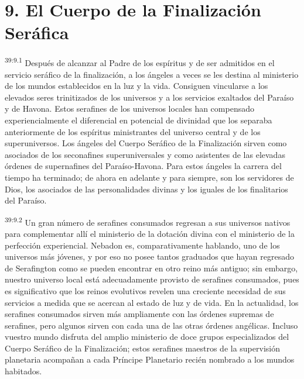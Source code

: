 \section*{9. El Cuerpo de la Finalización Seráfica}
\par
\textsuperscript{39:9.1} Después de alcanzar al Padre de los espíritus y de ser admitidos en el servicio seráfico de la finalización, a los ángeles a veces se les destina al ministerio de los mundos establecidos en la luz y la vida. Consiguen vincularse a los elevados seres trinitizados de los universos y a los servicios exaltados del Paraíso y de Havona. Estos serafines de los universos locales han compensado experiencialmente el diferencial en potencial de divinidad que los separaba anteriormente de los espíritus ministrantes del universo central y de los superuniversos. Los ángeles del Cuerpo Seráfico de la Finalización sirven como asociados de los seconafines superuniversales y como asistentes de las elevadas órdenes de supernafines del Paraíso-Havona. Para estos ángeles la carrera del tiempo ha terminado; de ahora en adelante y para siempre, son los servidores de Dios, los asociados de las personalidades divinas y los iguales de los finalitarios del Paraíso.

\par
\textsuperscript{39:9.2} Un gran número de serafines consumados regresan a sus universos nativos para complementar allí el ministerio de la dotación divina con el ministerio de la perfección experiencial. Nebadon es, comparativamente hablando, uno de los universos más jóvenes, y por eso no posee tantos graduados que hayan regresado de Serafington como se pueden encontrar en otro reino más antiguo; sin embargo, nuestro universo local está adecuadamente provisto de serafines consumados, pues es significativo que los reinos evolutivos revelen una creciente necesidad de sus servicios a medida que se acercan al estado de luz y de vida. En la actualidad, los serafines consumados sirven más ampliamente con las órdenes supremas de serafines, pero algunos sirven con cada una de las otras órdenes angélicas. Incluso vuestro mundo disfruta del amplio ministerio de doce grupos especializados del Cuerpo Seráfico de la Finalización; estos serafines maestros de la supervisión planetaria acompañan a cada Príncipe Planetario recién nombrado a los mundos habitados.


